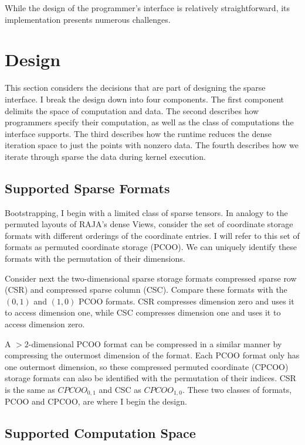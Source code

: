 While the design of the programmer's interface is relatively straightforward, its implementation presents numerous challenges.

\section{Design}







This section considers the decisions that are part of designing the sparse interface. 
I break the design down into four components.
The first component delimits the space of computation and data.
The second describes how programmers specify their computation, as well as the class of computations the interface supports.
The third describes how the runtime reduces the dense iteration space to just the points with nonzero data. 
The fourth describes how we iterate through sparse the data during kernel execution.

\subsection{Supported Sparse Formats}

Bootstrapping, I begin with a limited class of sparse tensors.
In analogy to the permuted layouts of RAJA's dense Views, consider the set of coordinate storage formats with different orderings of the coordinate entries.
I will refer to this set of formats as permuted coordinate storage (PCOO).
We can uniquely identify these formats with the permutation of their dimensions.

Consider next the two-dimensional sparse storage formats compressed sparse row (CSR) and compressed sparse column (CSC). 
Compare these formats with the $(0,1)$ and $(1,0)$ PCOO formats.
CSR compresses dimension zero and uses it to access dimension one, while CSC compresses dimension one and uses it to access dimension zero. 

A $>2$-dimensional PCOO format can be compressed in a similar manner by compressing the outermost dimension of the format. 
Each PCOO format only has one outermost dimension, so these compressed permuted coordinate (CPCOO) storage formats can also be identified with the permutation of their indices. 
CSR is the same as $CPCOO_{0,1}$ and CSC as $CPCOO_{1,0}$.
These two classes of formats, PCOO and CPCOO, are where I begin the design. 

\subsection{Supported Computation Space}


